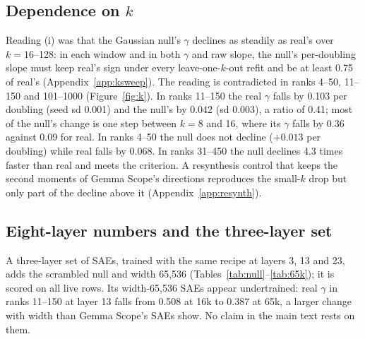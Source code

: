 \documentclass{article}
\newcommand{\Sig}{\Sigma}
\begin{document}
\subsection{Dependence on $k$}
\label{app:gk}


Reading (i) was that the Gaussian null's $\gamma$ declines as steadily as real's over $k=16$--128: in each window and in both $\gamma$ and raw slope, the null's per-doubling slope must keep real's sign under every leave-one-$k$-out refit and be at least 0.75 of real's (Appendix~\ref{app:ksweep}). The reading is contradicted in ranks 4--50, 11--150 and 101--1000 (Figure~\ref{fig:k}). In ranks 11--150 the real $\gamma$ falls by 0.103 per doubling (seed sd 0.001) and the null's by 0.042 (sd 0.003), a ratio of 0.41; most of the null's change is one step between $k=8$ and 16, where its $\gamma$ falls by 0.36 against 0.09 for real. In ranks 4--50 the null does not decline ($+0.013$ per doubling) while real falls by 0.068. In ranks 31--450 the null declines 4.3 times faster than real and meets the criterion. A resynthesis control that keeps the second moments of Gemma Scope's directions reproduces the small-$k$ drop but only part of the decline above it (Appendix~\ref{app:resynth}).

\subsection{Eight-layer numbers and the three-layer set}
\label{app:65k}

\begin{table}[!htb]
\centering
\caption{Eight layers of Gemma-2-2B at $k=40$, width 16,384: decoder eigen-slope at 8,192 live latents (mean of three seeds), the largest seed sd over the four windows, eval FVU, live latents (range over seeds, of 16,384), and $\Sig$'s slope from the 10M training tokens.}
\label{tab:null8}
\footnotesize
\setlength{\tabcolsep}{4pt}

\end{table}

A three-layer set of SAEs, trained with the same recipe at layers 3, 13 and 23, adds the scrambled null and width 65,536 (Tables~\ref{tab:null}--\ref{tab:65k}); it is scored on all live rows. Its width-65,536 SAEs appear undertrained: real $\gamma$ in ranks 11--150 at layer 13 falls from 0.508 at 16k to 0.387 at 65k, a larger change with width than Gemma Scope's SAEs show. No claim in the main text rests on them.
\end{document}
